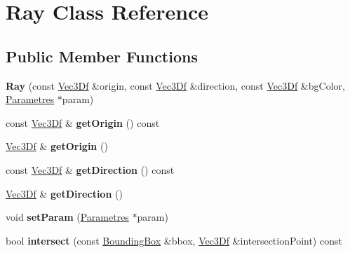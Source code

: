 \hypertarget{class_ray}{
\section{Ray Class Reference}
\label{class_ray}
}
\subsection*{Public Member Functions}
\begin{DoxyCompactItemize}
\item 
\hypertarget{class_ray_abad5657e70675cb55435231e0d636979}{
{\bfseries Ray} (const \hyperlink{class_vec3_d}{Vec3Df} \&origin, const \hyperlink{class_vec3_d}{Vec3Df} \&direction, const \hyperlink{class_vec3_d}{Vec3Df} \&bgColor, \hyperlink{class_parametres}{Parametres} $\ast$param)}
\label{class_ray_abad5657e70675cb55435231e0d636979}

\item 
\hypertarget{class_ray_ae4225450cd5f59c1f2e2bc55b1cdcc9f}{
const \hyperlink{class_vec3_d}{Vec3Df} \& {\bfseries getOrigin} () const }
\label{class_ray_ae4225450cd5f59c1f2e2bc55b1cdcc9f}

\item 
\hypertarget{class_ray_a4ffdcfc4d1e7fafe17f4e122856c3f87}{
\hyperlink{class_vec3_d}{Vec3Df} \& {\bfseries getOrigin} ()}
\label{class_ray_a4ffdcfc4d1e7fafe17f4e122856c3f87}

\item 
\hypertarget{class_ray_a1e83e988cfd711743042c49eac092006}{
const \hyperlink{class_vec3_d}{Vec3Df} \& {\bfseries getDirection} () const }
\label{class_ray_a1e83e988cfd711743042c49eac092006}

\item 
\hypertarget{class_ray_a8005eac632a3960446e3b202a89623cd}{
\hyperlink{class_vec3_d}{Vec3Df} \& {\bfseries getDirection} ()}
\label{class_ray_a8005eac632a3960446e3b202a89623cd}

\item 
\hypertarget{class_ray_a8f49b81dd458de63f8981096d88ef8cd}{
void {\bfseries setParam} (\hyperlink{class_parametres}{Parametres} $\ast$param)}
\label{class_ray_a8f49b81dd458de63f8981096d88ef8cd}

\item 
\hypertarget{class_ray_a85653d7f19e1b15783417898152d4ab9}{
bool {\bfseries intersect} (const \hyperlink{class_bounding_box}{BoundingBox} \&bbox, \hyperlink{class_vec3_d}{Vec3Df} \&intersectionPoint) const }
\label{class_ray_a85653d7f19e1b15783417898152d4ab9}


\end{DoxyCompactItemize}
